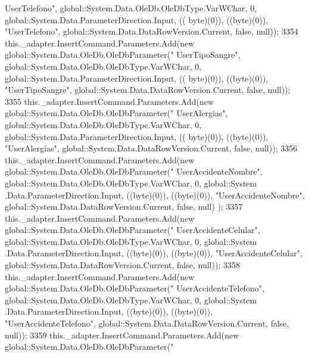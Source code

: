 \begin{DoxyCode}
{      UserTelefono"}, global::System.Data.OleDb.OleDbType.VarWChar, 0, global::System.Data.ParameterDirection.Input, ((
      byte)(0)), ((byte)(0)), \textcolor{stringliteral}{"UserTelefono"}, global::System.Data.DataRowVersion.Current, \textcolor{keyword}{false}, null));
3354             this.\_adapter.InsertCommand.Parameters.Add(\textcolor{keyword}{new} global::System.Data.OleDb.OleDbParameter(\textcolor{stringliteral}{"
      UserTipoSangre"}, global::System.Data.OleDb.OleDbType.VarWChar, 0, global::System.Data.ParameterDirection.Input, ((
      byte)(0)), ((byte)(0)), \textcolor{stringliteral}{"UserTipoSangre"}, global::System.Data.DataRowVersion.Current, \textcolor{keyword}{false}, null));
3355             this.\_adapter.InsertCommand.Parameters.Add(\textcolor{keyword}{new} global::System.Data.OleDb.OleDbParameter(\textcolor{stringliteral}{"
      UserAlergias"}, global::System.Data.OleDb.OleDbType.VarWChar, 0, global::System.Data.ParameterDirection.Input, ((
      byte)(0)), ((byte)(0)), \textcolor{stringliteral}{"UserAlergias"}, global::System.Data.DataRowVersion.Current, \textcolor{keyword}{false}, null));
3356             this.\_adapter.InsertCommand.Parameters.Add(\textcolor{keyword}{new} global::System.Data.OleDb.OleDbParameter(\textcolor{stringliteral}{"
      UserAccidenteNombre"}, global::System.Data.OleDb.OleDbType.VarWChar, 0, global::System
      .Data.ParameterDirection.Input, ((byte)(0)), ((byte)(0)), \textcolor{stringliteral}{"UserAccidenteNombre"}, global::System.Data.DataRowVersion.Current, \textcolor{keyword}{false}, null)
      );
3357             this.\_adapter.InsertCommand.Parameters.Add(\textcolor{keyword}{new} global::System.Data.OleDb.OleDbParameter(\textcolor{stringliteral}{"
      UserAccidenteCelular"}, global::System.Data.OleDb.OleDbType.VarWChar, 0, global::System
      .Data.ParameterDirection.Input, ((byte)(0)), ((byte)(0)), \textcolor{stringliteral}{"UserAccidenteCelular"}, global::System.Data.DataRowVersion.Current, \textcolor{keyword}{false}, 
      null));
3358             this.\_adapter.InsertCommand.Parameters.Add(\textcolor{keyword}{new} global::System.Data.OleDb.OleDbParameter(\textcolor{stringliteral}{"
      UserAccidenteTelefono"}, global::System.Data.OleDb.OleDbType.VarWChar, 0, global::System
      .Data.ParameterDirection.Input, ((byte)(0)), ((byte)(0)), \textcolor{stringliteral}{"UserAccidenteTelefono"}, global::System.Data.DataRowVersion.Current, \textcolor{keyword}{false}, 
      null));
3359             this.\_adapter.InsertCommand.Parameters.Add(\textcolor{keyword}{new} global::System.Data.OleDb.OleDbParameter(\textcolor{stringliteral}{"
}
\end{DoxyCode}
